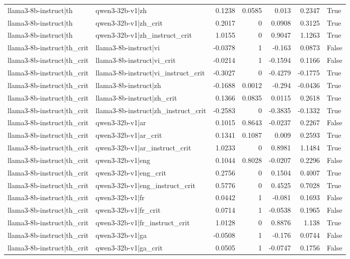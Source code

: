 \begin{table}
\begin{tabular}{l l r r r r l}
llama3-8b-instruct|th & qwen3-32b-v1|zh & 0.1238 & 0.0585 & 0.013 & 0.2347 & True \\
llama3-8b-instruct|th & qwen3-32b-v1|zh_crit & 0.2017 & 0 & 0.0908 & 0.3125 & True \\
llama3-8b-instruct|th & qwen3-32b-v1|zh_instruct_crit & 1.0155 & 0 & 0.9047 & 1.1263 & True \\
llama3-8b-instruct|th_crit & llama3-8b-instruct|vi & -0.0378 & 1 & -0.163 & 0.0873 & False \\
llama3-8b-instruct|th_crit & llama3-8b-instruct|vi_crit & -0.0214 & 1 & -0.1594 & 0.1166 & False \\
llama3-8b-instruct|th_crit & llama3-8b-instruct|vi_instruct_crit & -0.3027 & 0 & -0.4279 & -0.1775 & True \\
llama3-8b-instruct|th_crit & llama3-8b-instruct|zh & -0.1688 & 0.0012 & -0.294 & -0.0436 & True \\
llama3-8b-instruct|th_crit & llama3-8b-instruct|zh_crit & 0.1366 & 0.0835 & 0.0115 & 0.2618 & True \\
llama3-8b-instruct|th_crit & llama3-8b-instruct|zh_instruct_crit & -0.2583 & 0 & -0.3835 & -0.1332 & True \\
llama3-8b-instruct|th_crit & qwen3-32b-v1|ar & 0.1015 & 0.8643 & -0.0237 & 0.2267 & False \\
llama3-8b-instruct|th_crit & qwen3-32b-v1|ar_crit & 0.1341 & 0.1087 & 0.009 & 0.2593 & True \\
llama3-8b-instruct|th_crit & qwen3-32b-v1|ar_instruct_crit & 1.0233 & 0 & 0.8981 & 1.1484 & True \\
llama3-8b-instruct|th_crit & qwen3-32b-v1|eng & 0.1044 & 0.8028 & -0.0207 & 0.2296 & False \\
llama3-8b-instruct|th_crit & qwen3-32b-v1|eng_crit & 0.2756 & 0 & 0.1504 & 0.4007 & True \\
llama3-8b-instruct|th_crit & qwen3-32b-v1|eng_instruct_crit & 0.5776 & 0 & 0.4525 & 0.7028 & True \\
llama3-8b-instruct|th_crit & qwen3-32b-v1|fr & 0.0442 & 1 & -0.081 & 0.1693 & False \\
llama3-8b-instruct|th_crit & qwen3-32b-v1|fr_crit & 0.0714 & 1 & -0.0538 & 0.1965 & False \\
llama3-8b-instruct|th_crit & qwen3-32b-v1|fr_instruct_crit & 1.0128 & 0 & 0.8876 & 1.138 & True \\
llama3-8b-instruct|th_crit & qwen3-32b-v1|ga & -0.0508 & 1 & -0.176 & 0.0744 & False \\
llama3-8b-instruct|th_crit & qwen3-32b-v1|ga_crit & 0.0505 & 1 & -0.0747 & 0.1756 & False \\

\end{tabular}
\end{table}
